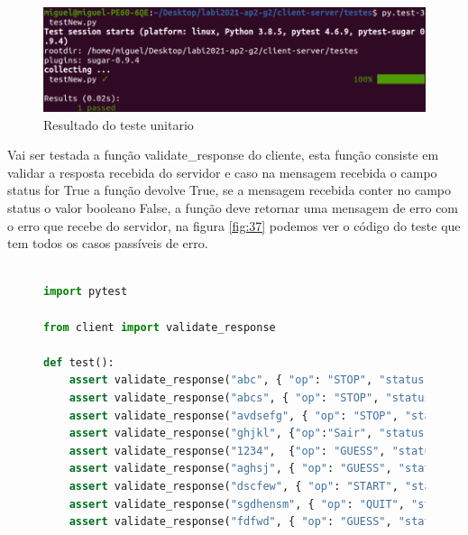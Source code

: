 \documentclass{report}
\newenvironment{changemargin}[2]{%
\begin{list}{}{%
\setlength{\topsep}{0pt}%
\setlength{\leftmargin}{#1}%
\setlength{\rightmargin}{#2}%
\setlength{\listparindent}{\parindent}%
\setlength{\itemindent}{\parindent}%
\setlength{\parsep}{\parskip}%
}%
\item[]}{\end{list}}
\theoremstyle{remark}
\begin{document}
{\begin{figure}[H]
\begin{changemargin}{-3.5cm}{-3.5cm}
\center
\includegraphics[width = 15 cm ]{testNew_result.png}
\caption{Resultado do teste unitario}\label{fig:36}
\end{changemargin}
\end{figure}

Vai ser testada a função validate\_response do cliente, esta função consiste em validar a resposta recebida do servidor e caso na mensagem recebida o campo status for True a função devolve True, se a mensagem recebida conter no campo status o valor booleano False, a função deve retornar uma mensagem de erro com o erro que recebe do servidor, na figura \ref{fig:37} podemos ver o código do teste que tem todos os casos passíveis de erro.

\begin{figure}[H]
\begin{changemargin}{-3.5cm}{-3.5cm}
\begin{tcolorbox}
\begin{lstlisting}[language=Python, inputencoding=utf8, breaklines=true, basicstyle=\small, showstringspaces=false]

import pytest

from client import validate_response

def test():
	assert validate_response("abc", { "op": "STOP", "status":False, "error": "Cliente inexistente" }) == "--- Erro: " + "Cliente inexistente" + " ---"
	assert validate_response("abcs", { "op": "STOP", "status":False, "error": "Excedeu o numero maximo de tentativas" })  == "--- Erro: " + "Excedeu o numero maximo de tentativas" + " ---"
	assert validate_response("avdsefg", { "op": "STOP", "status":False, "error": "Numero de jogadas inconsistente" }) == "--- Erro: " + "Numero de jogadas inconsistente" + " ---"
	assert validate_response("ghjkl", {"op":"Sair", "status": False, "error": "Operação inexistente (operações possivesis: \"START\", \"GUESS\", \"QUIT\", \"STOP\")"}) == "--- Erro: " + "Operação inexistente (operações possivesis: \"START\", \"GUESS\", \"QUIT\", \"STOP\")" + " ---"
	assert validate_response("1234",  {"op": "GUESS", "status":False, "error": "Tem de inserir um valor do tipo inteiro positivo" })	== "--- Erro: " + "Tem de inserir um valor do tipo inteiro positivo" + " ---"
	assert validate_response("aghsj", { "op": "GUESS", "status":False, "error": "Valor fora dos limites (0 <= number <= 100)" }) == "--- Erro: " + "Valor fora dos limites (0 <= number <= 100)" + " ---"
	assert validate_response("dscfew", { "op": "START", "status":True, "max_attempts": 22 }) == True
	assert validate_response("sgdhensm", { "op": "QUIT", "status":True}) == True
	assert validate_response("fdfwd", { "op": "GUESS", "status":True, "result": 20 }) == True
	

\end{lstlisting}
\end{tcolorbox}
\end{changemargin}
\end{figure}}
\end{document}
